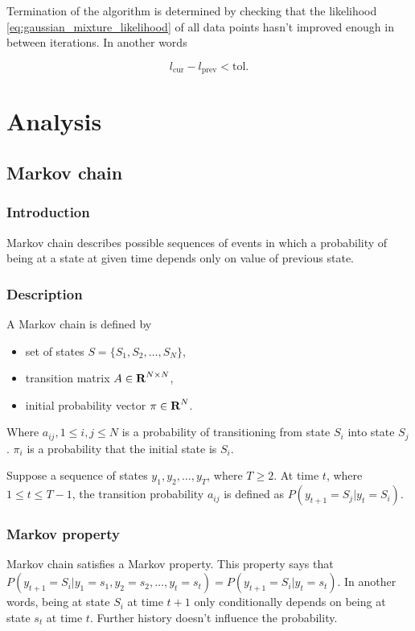 \documentclass[thesis=B,english]{FITthesis}[2012/06/26]
\begin{document}
Termination of the algorithm is determined by checking that the likelihood \ref{eq:gaussian_mixture_likelihood} of all data points hasn't improved enough in between iterations. In another words

\begin{equation}
l_{\text{cur}} - l_{\text{prev}} < \text{tol}.
\end{equation}

\chapter{Analysis}

\section{Markov chain}

\subsection{Introduction}
Markov chain describes possible sequences of events in which a probability of being at a state at given time depends only on value of previous state. 

\subsection{Description}

A Markov chain is defined by

\begin{itemize}
\item set of states $S = \{S_1, S_2, \dots, S_N\}$,
\item transition matrix $A \in \textbf R^{N \times N}$,
\item initial probability vector $\pi \in \textbf R^N$.
\end{itemize}

Where $a_{ij}, 1 \leq i,j \leq N$ is a probability of transitioning from state $S_i$ into state $S_j$. $\pi_i$ is a probability that the initial state is $S_i$.

Suppose a sequence of states $y_1, y_2, \dots, y_T$, where $T \geq 2$. At time $t$, where $1 \leq t \leq T-1$, the transition probability $a_{ij}$ is defined as $P(y_{t+1}=S_j | y_t=S_i)$.

\subsection{Markov property}
Markov chain satisfies a Markov property. This property says that $P(y_{t+1}=S_i|y_1=s_1,y_2=s_2,\dots,y_t=s_t) = P(y_{t+1}=S_{i}|y_t=s_t)$. In another words, being at state $S_i$ at time $t+1$ only conditionally depends on being at state $s_t$ at time $t$. Further history doesn't influence the probability.
\end{document}
